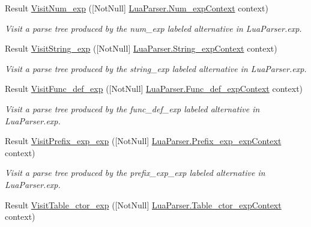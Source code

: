 \begin{DoxyCompactItemize}
Result \mbox{\hyperlink{interfacezlua_1_1_i_lua_visitor_a03c4e65421aa19e91ebfa0f97dd31f82}{Visit\+Num\+\_\+exp}} (\mbox{[}Not\+Null\mbox{]} \mbox{\hyperlink{classzlua_1_1_lua_parser_1_1_num__exp_context}{Lua\+Parser.\+Num\+\_\+exp\+Context}} context)
\begin{DoxyCompactList}\small\item\em Visit a parse tree produced by the {\ttfamily num\+\_\+exp} labeled alternative in Lua\+Parser.\+exp. \end{DoxyCompactList}\item 
Result \mbox{\hyperlink{interfacezlua_1_1_i_lua_visitor_a03f9e5eb30ac270a1efa99bfe98e2f96}{Visit\+String\+\_\+exp}} (\mbox{[}Not\+Null\mbox{]} \mbox{\hyperlink{classzlua_1_1_lua_parser_1_1_string__exp_context}{Lua\+Parser.\+String\+\_\+exp\+Context}} context)
\begin{DoxyCompactList}\small\item\em Visit a parse tree produced by the {\ttfamily string\+\_\+exp} labeled alternative in Lua\+Parser.\+exp. \end{DoxyCompactList}\item 
Result \mbox{\hyperlink{interfacezlua_1_1_i_lua_visitor_a2907308bdf63ed2a3311e89b411f0bb5}{Visit\+Func\+\_\+def\+\_\+exp}} (\mbox{[}Not\+Null\mbox{]} \mbox{\hyperlink{classzlua_1_1_lua_parser_1_1_func__def__exp_context}{Lua\+Parser.\+Func\+\_\+def\+\_\+exp\+Context}} context)
\begin{DoxyCompactList}\small\item\em Visit a parse tree produced by the {\ttfamily func\+\_\+def\+\_\+exp} labeled alternative in Lua\+Parser.\+exp. \end{DoxyCompactList}\item 
Result \mbox{\hyperlink{interfacezlua_1_1_i_lua_visitor_a8183a0ec15a6a77848310e5ea034e45d}{Visit\+Prefix\+\_\+exp\+\_\+exp}} (\mbox{[}Not\+Null\mbox{]} \mbox{\hyperlink{classzlua_1_1_lua_parser_1_1_prefix__exp__exp_context}{Lua\+Parser.\+Prefix\+\_\+exp\+\_\+exp\+Context}} context)
\begin{DoxyCompactList}\small\item\em Visit a parse tree produced by the {\ttfamily prefix\+\_\+exp\+\_\+exp} labeled alternative in Lua\+Parser.\+exp. \end{DoxyCompactList}\item 
Result \mbox{\hyperlink{interfacezlua_1_1_i_lua_visitor_a0a1b5d873890318ed0259f93eac4a5b7}{Visit\+Table\+\_\+ctor\+\_\+exp}} (\mbox{[}Not\+Null\mbox{]} \mbox{\hyperlink{classzlua_1_1_lua_parser_1_1_table__ctor__exp_context}{Lua\+Parser.\+Table\+\_\+ctor\+\_\+exp\+Context}} context)

\end{DoxyCompactItemize}
